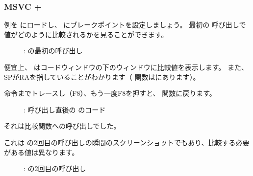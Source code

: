 ﻿\clearpage
\subsubsection{MSVC + \olly}
\myindex{\olly}

例を \olly にロードし、 \comp にブレークポイントを設定しましょう。
最初の \comp 呼び出しで値がどのように比較されるかを見ることができます。

\begin{figure}[H]
\centering
{}
\caption{\olly: \comp の最初の呼び出し}
\label{fig:qsort_olly1}
\end{figure}

便宜上、 \olly はコードウィンドウの下のウィンドウに比較値を表示します。
また、\ac{SP}が\ac{RA}を指していることがわかります（ \qsort 関数はにあります）。

\clearpage
{}命令までトレースし（F8）、もう一度F8を押すと、 \qsort 関数に戻ります。

\begin{figure}[H]
\centering
{}
\caption{\olly: \comp 呼び出し直後の \qsort のコード}
\label{fig:qsort_olly2}
\end{figure}

それは比較関数への呼び出しでした。

\clearpage
これは \comp の2回目の呼び出しの瞬間のスクリーンショットでもあり、比較する必要がある値は異なります。

\begin{figure}[H]
\centering
{}
\caption{\olly: \comp の2回目の呼び出し}
\label{fig:qsort_olly3}
\end{figure}
